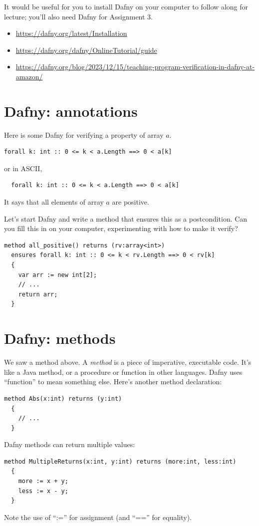 \documentclass[11pt]{article}
\begin{document}
It would be useful for you to install Dafny on your computer to follow along for lecture; you'll also
need Dafny for Assignment 3.

\begin{itemize}[noitemsep]
\item \url{https://dafny.org/latest/Installation}
\item \url{https://dafny.org/dafny/OnlineTutorial/guide}
\item \url{https://dafny.org/blog/2023/12/15/teaching-program-verification-in-dafny-at-amazon/}
\end{itemize}

\section*{Dafny: annotations}
Here is some Dafny for verifying a property of array $a$.
\begin{lstlisting}[language=dafny]
  forall k: int :: 0 <= k < a.Length ==> 0 < a[k]
\end{lstlisting}
or in ASCII,
\begin{verbatim}
  forall k: int :: 0 <= k < a.Length ==> 0 < a[k]
\end{verbatim}
It says that all elements of array $a$ are positive.

Let's start Dafny and write a method that ensures this as a postcondition.
Can you fill this in on your computer, experimenting with how to make it verify?
\begin{lstlisting}[language=dafny]
  method all_positive() returns (rv:array<int>)
  ensures forall k: int :: 0 <= k < rv.Length ==> 0 < rv[k]
  {
    var arr := new int[2];
    // ...
    return arr;
  }  
\end{lstlisting}

\section*{Dafny: methods}
We saw a method above. A \emph{method} is a piece of imperative, executable code.
It's like a Java method, or a procedure or function in other languages. Dafny uses
``function'' to mean something else. Here's another method declaration:
\begin{lstlisting}[language=dafny]
  method Abs(x:int) returns (y:int)
  {
    // ...
  }
\end{lstlisting}
Dafny methods can return multiple values:
\begin{lstlisting}[language=dafny]
  method MultipleReturns(x:int, y:int) returns (more:int, less:int)
  {
    more := x + y;
    less := x - y;
  }
\end{lstlisting}
Note the use of ``:='' for assignment (and ``=='' for equality).
\end{document}
